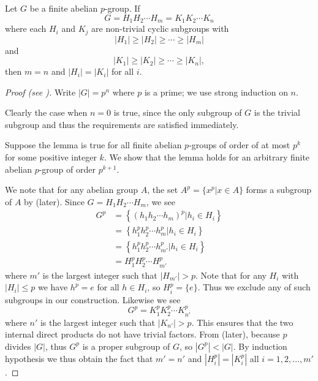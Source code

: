 \begin{lemma}\label{lemma-fundamental-theorem-of-finite-abelian-groups-4}
    Let $G$ be a finite abelian $p$-group. If
    \[
        G = H_1H_2\cdots H_m = K_1K_2\cdots K_n
    \]
    where each $H_i$ and $K_j$ are non-trivial cyclic subgroups with
    \[
        |H_1| \geq |H_2| \geq \cdots \geq |H_m|
    \]
    and
    \[
        |K_1| \geq |K_2| \geq \cdots \geq |K_n|,
    \]
    then $m = n$ and $|H_i| = |K_i|$ for all $i$.
\end{lemma}
\begin{proof}[Proof (see {\cite[p.~219, Lemma 4]{gallian_2016}})]
    Write $|G| = p^n$ where $p$ is a prime; we use strong induction on $n$.

    Clearly the case when $n = 0$ is true, since the only subgroup of $G$ is the trivial subgroup and thus the requirements are satisfied immediately.

    Suppose the lemma is true for all finite abelian $p$-groups of order of at most $p^k$ for some positive integer $k$. We show that the lemma holds for an arbitrary finite abelian $p$-group of order $p^{k+1}$.

    We note that for any abelian group $A$, the set $A^p = \{x^p \vert x \in A\}$ forms a subgroup of $A$ by  (later). Since $G = H_1H_2\cdots H_m$, we see
    \begin{align*}
        G^p &= \left\{\left(h_1h_2\cdots h_m\right)^p \vert h_i \in H_i\right\}\\
        &= \left\{h_1^ph_2^p\cdots h_m^p \vert h_i \in H_i\right\}\\
        &= \left\{h_1^ph_2^p\cdots h_{m'}^p \vert h_i \in H_i\right\}\\
        &= H_1^pH_2^p\cdots H_{m'}^p
    \end{align*}
    where $m'$ is the largest integer such that $|H_{m'}| > p$. Note that for any $H_i$ with $|H_i| \leq p$ we have $h^p = e$ for all $h \in H_i$, so $H_i^p = \{e\}$. Thus we exclude any of such subgroups in our construction. Likewise we see
    \[
        G^p = K_1^pK_2^p\cdots K_{n'}^p
    \]
    where $n'$ is the largest integer such that $|K_{n'}| > p$. This ensures that the two internal direct products do not have trivial factors. From  (later), because $p$ divides $|G|$, thus $G^p$ is a proper subgroup of $G$, so $|G^p| < |G|$. By induction hypothesis we thus obtain the fact that $m' = n'$ and $|H_i^p| = |K_i^p|$ all $i = 1, 2, \dots, m'$.


\end{proof}
